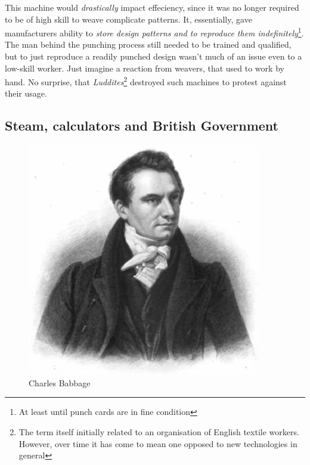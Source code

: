 \documentclass{report}
\begin{document}
            This machine would \emph{drastically} impact effeciency, since it was no longer required to be of high skill to weave complicate patterns. It, essentially, gave
            manufacturers ability to \emph{store design patterns and to reproduce them indefinitely}\footnote{At least until punch cards are in fine condition}. The man behind
            the punching process still needed to be trained and qualified, but to just reproduce a readily punched design wasn't much of an issue even to a low-skill worker.
            Just imagine a reaction from weavers, that used to work by hand. No surprise, that \emph{Luddites}\footnote{The term itself initially related to an organisation 
            of English textile workers. However, over time it has come to mean one opposed to new technologies in general}
            destroyed such machines to protest against their usage. \par
            
            \subsection{Steam, calculators and British Government}
            \begin{figure}
                \centering
                \includegraphics[scale=0.2]{images/persons/person_charles_babbage.png}
                \caption{Charles Babbage}
            \end{figure}
\end{document}
